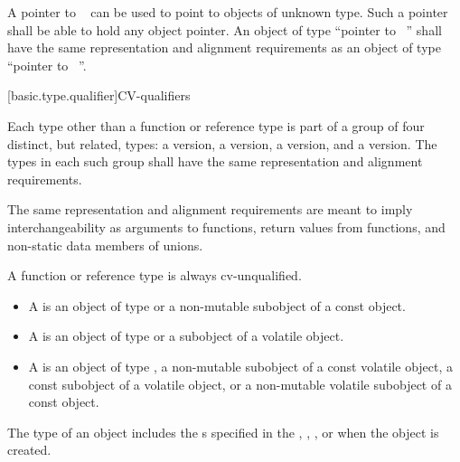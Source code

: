 \pnum
{}%
%
A pointer to \cv{}~
can be used to point to objects of
unknown type. Such a pointer shall be able to hold any object pointer.
An object of type ``pointer to \cv{}~''
shall have the same representation and alignment
requirements as an object of type ``pointer to \cv{}~''.

[basic.type.qualifier]{CV-qualifiers}

\pnum
{}%
%
%
Each type other than a function or reference type
is part of a group of four distinct, but related, types:
a  version,
a  version,
a  version, and
a  version.
The types in each such group shall have
the same representation and alignment requirements.
\begin{footnote}
The same representation and alignment requirements
are meant to imply interchangeability as
arguments to functions,
return values from functions, and
non-static data members of unions.
\end{footnote}
A function or reference type is always cv-unqualified.
\begin{itemize}
\item A  is an object of type  or a
  non-mutable subobject of a const object.

\item A  is an object of type
   or a subobject of a volatile object.

\item A  is an object of type
  , a non-mutable subobject of a const volatile object,
  a const subobject of a volatile object, or a non-mutable volatile
  subobject of a const object.
\end{itemize}
\begin{note}
The type of an object includes
the s specified in the
,
,
, or
when the object is created.
\end{note}

